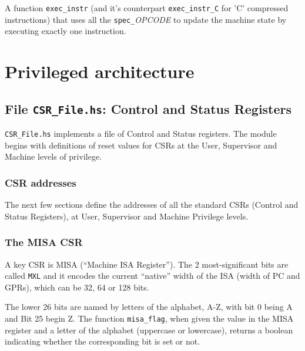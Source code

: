 \documentclass[11pt]{article}
\begin{document}
A function \verb|exec_instr| (and it's counterpart
\verb|exec_instr_C| for 'C' compressed instructions) that uses all the
\verb|spec_|{\it{}OPCODE} to update the machine state by executing
exactly one instruction.


\section{Privileged architecture}


\subsection{File {\tt CSR\_File.hs}: Control and Status Registers}

\label{sec_csrs}

\verb|CSR_File.hs| implements a file of Control and Status registers.
The module begins with definitions of reset values for CSRs at the
User, Supervisor and Machine levels of privilege.


\subsubsection{CSR addresses}

The next few sections define the addresses of all the standard CSRs
(Control and Status Registers), at User, Supervisor and Machine
Privilege levels.




\subsubsection{The MISA CSR}

A key CSR is MISA (``Machine ISA Register'').  The 2 most-significant
bits are called \verb|MXL| and it encodes the current ``native'' width
of the ISA (width of PC and GPRs), which can be 32, 64 or 128 bits.



The lower 26 bits are named by letters of the alphabet, A-Z, with bit
0 being A and Bit 25 begin Z.  The function \verb|misa_flag|, when
given the value in the MISA register and a letter of the alphabet
(uppercase or lowercase), returns a boolean indicating whether the
corresponding bit is set or not.
\end{document}
